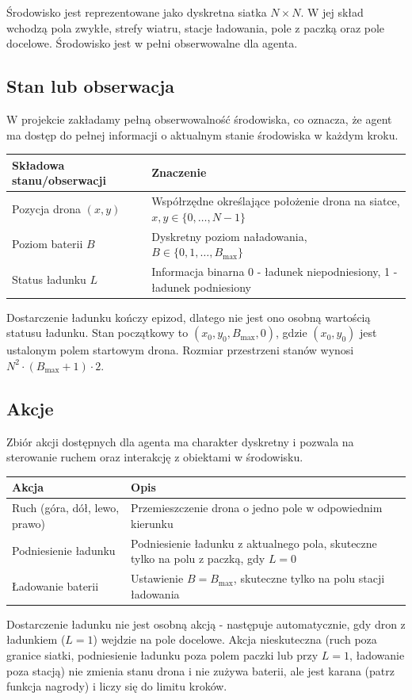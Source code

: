 \documentclass[12pt]{article}
\begin{document}
Środowisko jest reprezentowane jako dyskretna siatka $N \times N$. W jej skład wchodzą pola zwykłe, strefy wiatru, stacje ładowania, pole z paczką oraz pole docelowe. Środowisko jest w pełni obserwowalne dla agenta.


\subsection{Stan lub obserwacja}

W projekcie zakładamy pełną obserwowalność środowiska, co oznacza, że agent ma dostęp do pełnej informacji o aktualnym stanie środowiska w każdym kroku. 

\begin{center}
\begin{tabular}{p{}p{}}
\toprule
Składowa stanu/obserwacji & Znaczenie \\
\midrule
Pozycja drona $(x, y)$ & Współrzędne określające położenie drona na siatce, $x, y \in \{0, \dots, N-1\}$ \\
Poziom baterii $B$ & Dyskretny poziom naładowania, $B \in \{0, 1, \dots, B_{\max}\}$ \\
Status ładunku $L$ & Informacja binarna 0 - ładunek niepodniesiony, 1 - ładunek podniesiony \\
\bottomrule
\end{tabular}
\end{center}

Dostarczenie ładunku kończy epizod, dlatego nie jest ono osobną wartością statusu ładunku. Stan początkowy to $(x_0, y_0, B_{\max}, 0)$, gdzie $(x_0, y_0)$ jest ustalonym polem startowym drona. Rozmiar przestrzeni stanów wynosi $N^2 \cdot (B_{\max}+1) \cdot 2$.
 \subsection{Akcje}

Zbiór akcji dostępnych dla agenta ma charakter dyskretny i pozwala na sterowanie ruchem oraz interakcję z obiektami w środowisku.

\begin{center}
\begin{tabular}{p{}p{}}
\toprule
Akcja & Opis \\
\midrule
Ruch (góra, dół, lewo, prawo) & Przemieszczenie drona o jedno pole w odpowiednim kierunku \\
Podniesienie ładunku & Podniesienie ładunku z aktualnego pola, skuteczne tylko na polu z paczką, gdy $L=0$ \\
Ładowanie baterii & Ustawienie $B = B_{\text{max}}$, skuteczne tylko na polu stacji ładowania \\
\bottomrule
\end{tabular}
\end{center}
Dostarczenie ładunku nie jest osobną akcją - następuje automatycznie, gdy dron z ładunkiem ($L=1$) wejdzie na pole docelowe. Akcja nieskuteczna (ruch poza granice siatki, podniesienie ładunku poza polem paczki lub przy $L=1$, ładowanie poza stacją) nie zmienia stanu drona i nie zużywa baterii, ale jest karana (patrz funkcja nagrody) i liczy się do limitu kroków.
\end{document}
